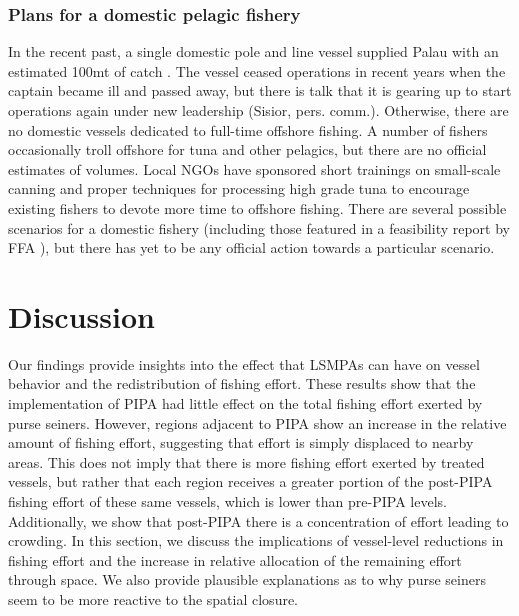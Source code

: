 \documentclass[9pttwoside,lineno]{pnas-new}
\begin{document}


\subsubsection{Plans for a domestic pelagic fishery}

In the recent past, a single domestic pole and line vessel supplied Palau with an estimated 100mt of catch \cite{Gillett2016}. The vessel ceased operations in recent years when the captain became ill and passed away, but there is talk that it is gearing up to start operations again under new leadership (Sisior, pers. comm.). Otherwise, there are no domestic vessels dedicated to full-time offshore fishing. A number of fishers occasionally troll offshore for tuna and other pelagics, but there are no official estimates of volumes. 
Local NGOs have sponsored short trainings on small-scale canning and proper techniques for processing high grade tuna to encourage existing fishers to devote more time to offshore fishing. There are several possible scenarios for a domestic fishery (including those featured in a feasibility report by FFA \citep{Skirtun2017}), but there has yet to be any official action towards a particular scenario. 
 
\clearpage


\section{Discussion}\label{discussion}

Our findings provide insights into the effect that LSMPAs
can have on vessel behavior and the redistribution of fishing effort.
These results show that the implementation of PIPA had
little effect on the total fishing effort exerted by purse seiners. However, regions
adjacent to PIPA show an increase in the relative amount of fishing
effort, suggesting that effort is simply displaced to nearby areas.
This does not imply that there is more fishing effort exerted by treated
vessels, but rather that each region receives a greater portion of the
post-PIPA fishing effort of these same vessels, which is lower than
pre-PIPA levels. Additionally, we show that post-PIPA there is a
concentration of effort leading to crowding. In this section, we discuss
the implications of vessel-level reductions in fishing effort and the
increase in relative allocation of the remaining effort through space.
We also provide plausible explanations as to why purse seiners seem to
be more reactive to the spatial closure.
\end{document}
